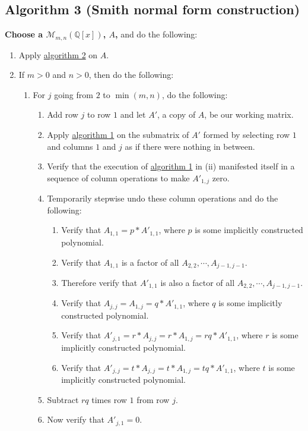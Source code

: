 \documentclass[twocolumn]{article}
\begin{document}
		\subsection{Algorithm 3 (Smith normal form construction)}\label{sec:algorithm 3}
			\textbf{Choose a $\mathcal{M}_{m,n}(\mathbb{Q}[x])$, $A$,} and do the following:
			\begin{enumerate}
				\item Apply \hyperref[sec:algorithm 2]{algorithm 2} on $A$.
				\item If $m>0$ and $n>0$, then do the following:
				\begin{enumerate}
					\item For $j$ going from $2$ to $\min(m,n)$, do the following:
					\begin{enumerate}
						\item Add row $j$ to row $1$ and let $A'$, a copy of $A$, be our working matrix.
						\item Apply \hyperref[sec:algorithm 1]{algorithm 1} on the submatrix of $A'$ formed by selecting row $1$ and columns $1$ and $j$ as if there were nothing in between.
						\item Verify that the execution of \hyperref[sec:algorithm 1]{algorithm 1} in (ii) manifested itself in a sequence of column operations to make $A'_{1,j}$ zero.
						\item Temporarily stepwise undo these column operations and do the following:
						\begin{enumerate}
							\item Verify that $A_{1,1}=p*A'_{1,1}$, where $p$ is some implicitly constructed polynomial.
							\item Verify that $A_{1,1}$ is a factor of all $A_{2,2},\cdots,A_{j-1,j-1}$.
							\item Therefore verify that $A'_{1,1}$ is also a factor of all $A_{2,2},\cdots,A_{j-1,j-1}$.
							\item Verify that $A_{j,j}=A_{1,j}=q*A'_{1,1}$, where $q$ is some implicitly constructed polynomial.
							\item Verify that $A'_{j,1}=r*A_{j,j}=r*A_{1,j}=rq*A'_{1,1}$, where $r$ is some implicitly constructed polynomial.
							\item Verify that $A'_{j,j}=t*A_{j,j}=t*A_{1,j}=tq*A'_{1,1}$, where $t$ is some implicitly constructed polynomial.
						\end{enumerate}
						\item Subtract $rq$ times row $1$ from row $j$.
						\item Now verify that $A'_{j,1}=0$.

\end{enumerate}
\end{enumerate}
\end{enumerate}
\end{document}
